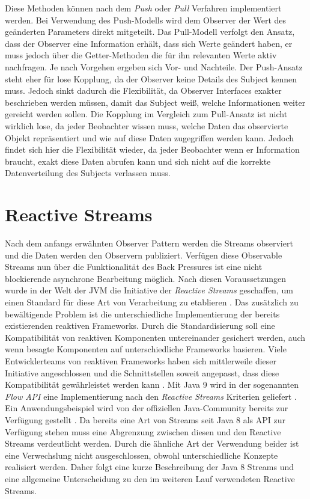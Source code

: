 Diese Methoden können nach dem \textit{Push} oder \textit{Pull} Verfahren implementiert werden. Bei Verwendung des Push-Modells wird dem Observer der Wert des geänderten Parameters direkt mitgeteilt. Das Pull-Modell verfolgt den Ansatz, dass der Observer eine Information erhält, dass sich Werte geändert haben, er muss jedoch über die Getter-Methoden die für ihn relevanten Werte aktiv nachfragen. Je nach Vorgehen ergeben sich Vor- und Nachteile. Der Push-Ansatz steht eher für lose Kopplung, da der Observer keine Details des Subject kennen muss. Jedoch sinkt dadurch die Flexibilität, da Observer Interfaces exakter beschrieben werden müssen, damit das Subject weiß, welche Informationen weiter gereicht werden sollen. Die Kopplung im Vergleich zum Pull-Ansatz ist nicht wirklich lose, da jeder Beobachter wissen muss, welche Daten das observierte Objekt repräsentiert und wie auf diese Daten zugegriffen werden kann. Jedoch findet sich hier die Flexibilität wieder, da jeder Beobachter wenn er Information braucht, exakt diese Daten abrufen kann und sich nicht auf die korrekte Datenverteilung des Subjects verlassen muss.
\section{Reactive Streams}
Nach dem anfangs erwähnten Observer Pattern werden die Streams observiert und die Daten werden den Observern publiziert. Verfügen diese Observable Streams nun über die Funktionalität des Back Pressures ist eine nicht blockierende asynchrone Bearbeitung möglich. Nach diesen Voraussetzungen wurde in der Welt der JVM die Initiative der \textit{Reactive Streams} geschaffen, um einen Standard für diese Art von Verarbeitung zu etablieren \cite{rsmain}. Das zusätzlich zu bewältigende Problem ist die unterschiedliche Implementierung der bereits existierenden reaktiven Frameworks. Durch die Standardisierung soll eine Kompatibilität von reaktiven Komponenten untereinander gesichert werden, auch wenn besagte Komponenten auf unterschiedliche Frameworks basieren. Viele Entwicklerteams von reaktiven Frameworks haben sich mittlerweile dieser Initiative angeschlossen und die Schnittstellen soweit angepasst, dass diese Kompatibilität gewährleistet werden kann \cite{rslsting}. Mit Java 9 wird in der sogenannten \textit{Flow API} eine Implementierung nach den \textit{Reactive Streams} Kriterien geliefert \cite{flowdoc}. Ein Anwendungsbeispiel wird von der offiziellen Java-Community bereits zur Verfügung gestellt \cite{flowexmpl}. Da bereits eine Art von Streams seit Java 8 als API zur Verfügung stehen muss eine Abgrenzung zwischen diesen und den Reactive Streams verdeutlicht werden. Durch die ähnliche Art der Verwendung beider ist eine Verwechslung nicht ausgeschlossen, obwohl unterschiedliche Konzepte realisiert werden. Daher folgt eine kurze Beschreibung der Java 8 Streams und eine allgemeine Unterscheidung zu den im weiteren Lauf verwendeten Reactive Streams. 
